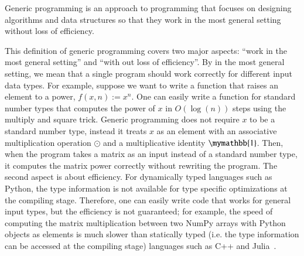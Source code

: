 \documentclass[onefignum, onetabnum]{siamart190516}
\newcommand{\<}{\langle}
\renewcommand{\>}{\rangle}
\newcommand{\blue}[1]{[{\bf  \color{blue}{JG: #1}}]}
\newcommand{\purple}[1]{[{\bf  \color{purple}{MC: #1}}]}
\newcommand{\xpurple}[1]{[{\bf  \color{purple}{\sout{MC: #1}}}]}
\newcounter{example}
\begin{document}
\begin{definition}
   Generic programming is an approach to programming that focuses on designing algorithms and data structures so that they work in the most general setting without loss of efficiency.
\end{definition}
This definition of generic programming covers two major aspects: ``work in the most general setting'' and ``with out loss of efficiency''.
By in the most general setting, we mean that a single program should work correctly for different input data types. 
For example, suppose we want to write a function that raises an element to a power, $f(x, n) := x^n$.
One can easily write a function for standard number types that computes the power of $x$ in $O \left( \log(n) \right)$ steps using the multiply and square trick.
Generic programming does not require $x$ to be a standard number type,
instead it treats $x$ as an element with an associative multiplication operation $\odot$ and a multiplicative identity $\mymathbb{1}$.
Then, when the program takes a matrix as an input instead of a standard number type, it computes the matrix power correctly without rewriting the program.
The second aspect is about efficiency. For dynamically typed languages such as Python, the type information is not available for type specific optimizations at the compiling stage.
Therefore, one can easily write code that works for general input types, but the efficiency is not guaranteed; for example, the speed of computing the matrix multiplication between two NumPy arrays with Python objects as elements is much slower than statically typed (i.e. the type information can be accessed at the compiling stage) languages such as C++ and Julia~\cite{Bezanson2012}.
\end{document}
